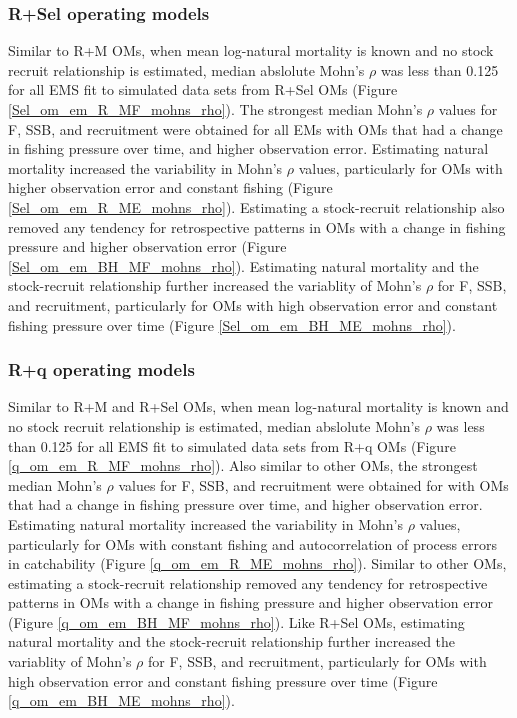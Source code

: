 \documentclass[
  12pt,
]{article}
\begin{document}
\hypertarget{rsel-operating-models-3}{%
\subsubsection*{R+Sel operating models}\label{rsel-operating-models-3}}

Similar to R+M OMs, when mean log-natural mortality is known and no
stock recruit relationship is estimated, median abslolute Mohn's
\(\rho\) was less than 0.125 for all EMS fit to simulated data sets from
R+Sel OMs (Figure \ref{Sel_om_em_R_MF_mohns_rho}). The strongest median
Mohn's \(\rho\) values for F, SSB, and recruitment were obtained for all
EMs with OMs that had a change in fishing pressure over time, and higher
observation error. Estimating natural mortality increased the
variability in Mohn's \(\rho\) values, particularly for OMs with higher
observation error and constant fishing (Figure
\ref{Sel_om_em_R_ME_mohns_rho}). Estimating a stock-recruit relationship
also removed any tendency for retrospective patterns in OMs with a
change in fishing pressure and higher observation error (Figure
\ref{Sel_om_em_BH_MF_mohns_rho}). Estimating natural mortality and the
stock-recruit relationship further increased the variablity of Mohn's
\(\rho\) for F, SSB, and recruitment, particularly for OMs with high
observation error and constant fishing pressure over time (Figure
\ref{Sel_om_em_BH_ME_mohns_rho}).

\hypertarget{rq-operating-models-2}{%
\subsubsection*{R+q operating models}\label{rq-operating-models-2}}

Similar to R+M and R+Sel OMs, when mean log-natural mortality is known
and no stock recruit relationship is estimated, median abslolute Mohn's
\(\rho\) was less than 0.125 for all EMS fit to simulated data sets from
R+q OMs (Figure \ref{q_om_em_R_MF_mohns_rho}). Also similar to other
OMs, the strongest median Mohn's \(\rho\) values for F, SSB, and
recruitment were obtained for with OMs that had a change in fishing
pressure over time, and higher observation error. Estimating natural
mortality increased the variability in Mohn's \(\rho\) values,
particularly for OMs with constant fishing and autocorrelation of
process errors in catchability (Figure \ref{q_om_em_R_ME_mohns_rho}).
Similar to other OMs, estimating a stock-recruit relationship removed
any tendency for retrospective patterns in OMs with a change in fishing
pressure and higher observation error (Figure
\ref{q_om_em_BH_MF_mohns_rho}). Like R+Sel OMs, estimating natural
mortality and the stock-recruit relationship further increased the
variablity of Mohn's \(\rho\) for F, SSB, and recruitment, particularly
for OMs with high observation error and constant fishing pressure over
time (Figure \ref{q_om_em_BH_ME_mohns_rho}).
\end{document}
